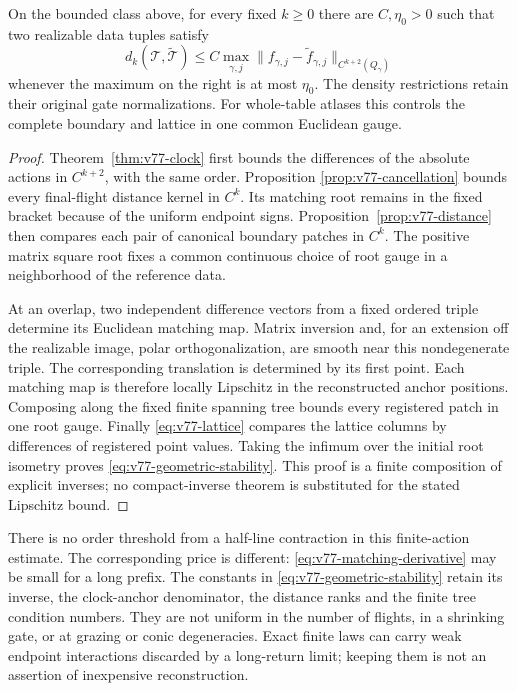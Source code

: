 \begin{theorem}
\label{thm:v77-stability}
On the bounded class above, for every fixed $k\ge0$ there are
$C,\eta_0>0$ such that two realizable data tuples satisfy
\begin{equation}\label{eq:v77-geometric-stability}
 d_k(\mathcal T,\widetilde{\mathcal T})
 \le C\max_{\gamma,j}
       \|f_{\gamma,j}-\widetilde f_{\gamma,j}\|_{C^{k+2}(Q_\gamma)}
\end{equation}
whenever the maximum on the right is at most $\eta_0$.
The density restrictions retain their original gate normalizations.
For whole-table atlases this controls the complete boundary and lattice
in one common Euclidean gauge.
\end{theorem}
\begin{proof}
Theorem~\ref{thm:v77-clock} first bounds the differences of the absolute
actions in $C^{k+2}$, with the same order.  Proposition
\ref{prop:v77-cancellation} bounds every final-flight distance kernel
in $C^k$.  Its matching root remains in the fixed bracket because of
the uniform endpoint signs.  Proposition~\ref{prop:v77-distance}
then compares each pair of canonical boundary patches in $C^k$.
The positive matrix square root fixes a common continuous choice of
root gauge in a neighborhood of the reference data.

At an overlap, two independent difference vectors from a fixed ordered
triple determine its Euclidean matching map.  Matrix inversion and,
for an extension off the realizable image, polar orthogonalization,
are smooth near this nondegenerate triple.  The corresponding
translation is determined by its first point.  Each matching map is
therefore locally Lipschitz in the reconstructed anchor positions.
Composing along the fixed finite spanning tree bounds every registered
patch in one root gauge.  Finally \eqref{eq:v77-lattice} compares the
lattice columns by differences of registered point values.  Taking the
infimum over the initial root isometry proves
\eqref{eq:v77-geometric-stability}.  This proof is a finite composition
of explicit inverses; no compact-inverse theorem is substituted for the
stated Lipschitz bound.
\end{proof}

There is no order threshold from a half-line contraction in this
finite-action estimate.  The corresponding price is different:
\eqref{eq:v77-matching-derivative} may be small for a long prefix.
The constants in \eqref{eq:v77-geometric-stability} retain its inverse,
the clock-anchor denominator, the distance ranks and the finite tree
condition numbers.  They are not uniform in the number of flights,
in a shrinking gate, or at grazing or conic degeneracies.  Exact finite
laws can carry weak endpoint interactions discarded by a long-return
limit; keeping them is not an assertion of inexpensive reconstruction.

